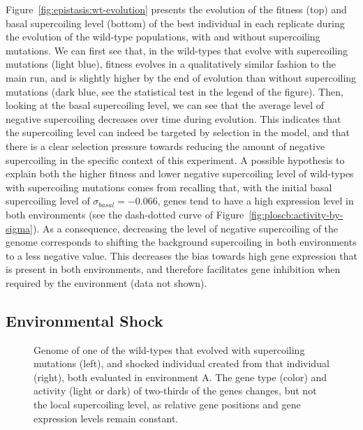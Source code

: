 Figure~\ref{fig:epistasis:wt-evolution} presents the evolution of the fitness (top) and basal supercoiling level (bottom) of the best individual in each replicate during the evolution of the wild-type populations, with and without supercoiling mutations.
We can first see that, in the wild-types that evolve with supercoiling mutations (light blue), fitness evolves in a qualitatively similar fashion to the main run, and is slightly higher by the end of evolution than without supercoiling mutations (dark blue, see the statistical test in the legend of the figure).
Then, looking at the basal supercoiling level, we can see that the average level of negative supercoiling decreases over time during evolution.
This indicates that the supercoiling level can indeed be targeted by selection in the model, and that there is a clear selection pressure towards reducing the amount of negative supercoiling in the specific context of this experiment.
A possible hypothesis to explain both the higher fitness and lower negative supercoiling level of wild-types with supercoiling mutations comes from recalling that, with the initial basal supercoiling level of $\sigma_{basal} = -0.066$, genes tend to have a high expression level in both environments (see the dash-dotted curve of Figure~\ref{fig:ploscb:activity-by-sigma}).
As a consequence, decreasing the level of negative supercoiling of the genome corresponds to shifting the background supercoiling in both environments to a less negative value.
This decreases the bias towards high gene expression that is present in both environments, and therefore facilitates gene inhibition when required by the environment (data not shown).

\subsection{Environmental Shock}

\begin{figure}
\centering
\begin{elasticrow}[width=\textwidth]
\end{elasticrow}
\caption[Evolved wild-type individual before and after an environmental shock]{Genome of one of the wild-types that evolved with supercoiling mutations (left), and shocked individual created from that individual (right), both evaluated in environment A.
The gene type (color) and activity (light or dark) of two-thirds of the genes changes, but not the local supercoiling level, as relative gene positions and gene expression levels remain constant.}
\label{fig:epistasis:shock}
\end{figure}


